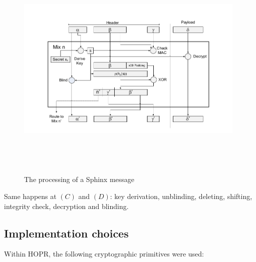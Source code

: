 \begin{figure}[H]
    \centering
    \includegraphics[width=11cm,height=11cm,keepaspectratio]{../yellowpaper/images/sphinx1.png}
    \caption{The processing of a Sphinx message \cite{sphinxpaper}}
    \label{fig:The processing of a Sphinx message }
\end{figure}
\hspace{-5mm}Same happens at $(C)$ and $(D)$: key derivation, unblinding, deleting, shifting, integrity check, decryption and blinding.

\subsection{Implementation choices}

Within HOPR, the following cryptographic primitives were used:

